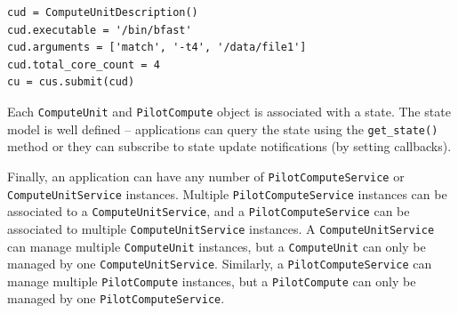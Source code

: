 \documentclass[conference]{IEEEtran}
\begin{document}
\begin{minipage}{0.45 \textwidth}
\begin{lstlisting}[caption={\I{Instantiation and 
	submission of a \texttt{Compute\-Unit\-Description}.}}, label={lst:submission}] 
cud = ComputeUnitDescription()
cud.executable = '/bin/bfast'
cud.arguments = ['match', '-t4', '/data/file1']
cud.total_core_count = 4
cu = cus.submit(cud)
\end{lstlisting}
\end{minipage}





Each \texttt{Compute\-Unit} and \texttt{Pilot\-Compute} object is associated
with a state.
The state model is well defined --
applications can query the state using the \texttt{get\_state()} method or they
can subscribe to state update notifications (by setting callbacks).

Finally, an application can have any number of \texttt{Pilot\-Compute\-Service} or
\texttt{Compute\-Unit\-Service} instances.
Multiple \texttt{Pilot\-Compute\-Service} instances can be associated to a
\texttt{Compute\-Unit\-Service}, and a \texttt{Pilot\-Compute\-Service} can be associated to
multiple \texttt{Compute\-Unit\-Service} instances.
A \texttt{Compute\-Unit\-Service} can manage multiple \texttt{Compute\-Unit}
instances, but a \texttt{Compute\-Unit} can only be managed by one
\texttt{Compute\-Unit\-Service}.
Similarly, a \texttt{Pilot\-Compute\-Service} can manage multiple
\texttt{Pilot\-Compute} instances, but a \texttt{Pilot\-Compute} can only be
managed by one \texttt{Pilot\-Compute\-Service}.
\end{document}
